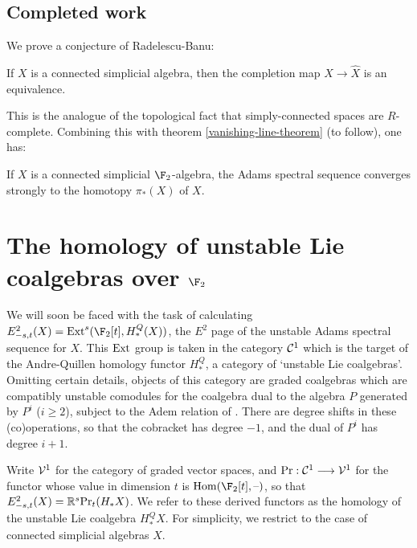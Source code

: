 \documentclass[11pt]{article}
\begin{document}
\subsection{Completed work}
We prove a conjecture of Radelescu-Banu:
\begin{thm}
If $X$ is a connected simplicial algebra, then the completion map $X\to \hat X$ is an equivalence.
\end{thm}
This is the analogue of the topological fact that simply-connected spaces are $R$-complete. Combining this with theorem \ref{vanishing-line-theorem} (to follow), one has:
\begin{cor}
If $X$ is a connected simplicial $\F_2$-algebra, the Adams spectral sequence converges strongly to the homotopy $\pi_*(X)$ of $X$.
\end{cor}
\section{The homology of unstable Lie coalgebras over $\F_2$}
We will soon be faced with the task of calculating $E^2_{-s,t}(X)=\Ext^s(\F_2[t],H_*^Q(X))$, the $E^2$ page of the unstable Adams spectral sequence for $X$. This $\operatorname{Ext}$ group is taken in the category $\mathcal{C}^1$ which is the target of the Andre-Quillen homology functor $H_*^Q$, a category of `unstable Lie coalgebras'. Omitting certain details, objects of this category are graded coalgebras which are compatibly unstable comodules for the coalgebra dual to the algebra $P$ generated by $P^i$ ($i\geq2$), subject to the Adem relation of \cite[p.17]{MR1089001}. There are degree shifts in these (co)operations, so that the cobracket has degree $-1$, and the dual of $P^i$ has degree $i+1$.

Write $\mathcal{V}^1$ for the category of graded vector spaces, and $\textup{Pr}:\mathcal{C}^1\longrightarrow \mathcal{V}^1$ for the functor whose value in dimension $t$ is $\Hom(\F_2[t],\DASH)$, so that $E^2_{-s,t}(X)=\mathbb{R}^s\textup{Pr}_t(H_*X)$. We refer to these derived functors as the homology of the unstable Lie coalgebra $H_*^QX$. For simplicity, we restrict to the case of connected simplicial algebras $X$.
\end{document}
